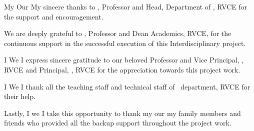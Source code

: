 \ifPG My \else \ifStuNameBUsed Our \else My \fi\fi sincere thanks to \textbf{\printHOD}, Professor and Head, Department of \ifIDP \printGuideDeptAInLF\else\printDepartmentLF\fi, RVCE for the support and encouragement.\\ \par

\ifIDP
We are deeply grateful to \textbf{\printDA}, Professor and Dean Academics, RVCE, for the continuous support in the successful execution of this Interdisciplinary project.
\\ \par
\fi
\ifPG I \else \ifStuNameBUsed We \else I \fi\fi express sincere gratitude to our beloved Professor and Vice Principal, \textbf{\printVicePrincipal}, RVCE and Principal, \textbf{\printPrincipal}, RVCE for the appreciation towards this project work.\\ \par

\ifIDP \else\ifPG I \else\ifStuNameBUsed We \else I \fi\fi thank all the teaching staff and technical staff of \ifIDP \printGuideDeptAInLF\else\printDepartmentLF\fi\, department, RVCE for their help.\\ \par \fi

Lastly, \ifPG I \else\ifStuNameBUsed we \else I \fi\fi take this opportunity to thank \ifPG my \else\ifStuNameBUsed our \else my \fi\fi family members and friends who provided all the backup support throughout the project work.\\ \par